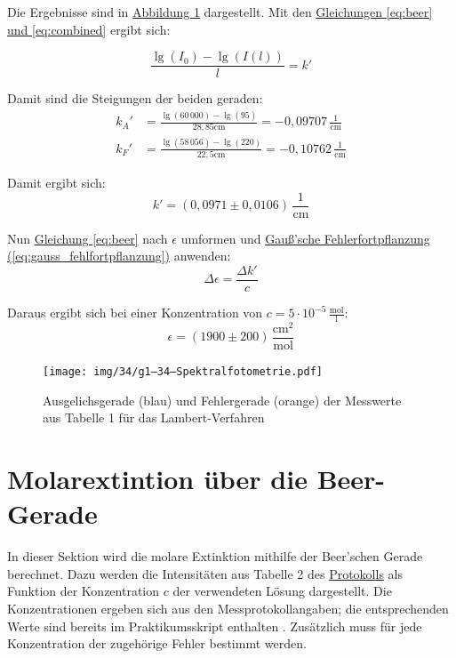 Die Ergebnisse sind in \hyperref[fig:g_l]{Abbildung \ref*{fig:g_l}} dargestellt. Mit den \hyperref[eq:beer]{Gleichungen \ref*{eq:beer} und \ref*{eq:combined}} ergibt sich:

\begin{equation}
\frac{\lg(I_0) - \lg(I(l))}{l} = k'
\end{equation}

Damit sind die Steigungen der beiden geraden:
\begin{align}
    {k_A}' &= \frac{\lg(60\,000) - \lg(95)}{28,85\mathrm{cm}} = -0,09707 \, \frac{1}{\mathrm{cm}}\\
    {k_F}' &= \frac{\lg(58\,056) - \lg(220)}{22,5\mathrm{cm}} = -0,10762 \, \frac{1}{\mathrm{cm}}
\end{align}

Damit ergibt sich:
\begin{equation}
\boxed{
    k' = (0,0971\pm 0,0106) \, \frac{1}{\mathrm{cm}}
}
\end{equation}

Nun \hyperref[eq:beer]{Gleichung \ref*{eq:beer}} nach $\epsilon$ umformen und \hyperref[eq:gauss_fehlfortpflanzung]{Gauß'sche Fehlerfortpflanzung (\ref*{eq:gauss_fehlfortpflanzung})} anwenden:
\begin{equation}
    \Delta \epsilon = \frac{\Delta k'}{c}
\end{equation}

Daraus ergibt sich bei einer Konzentration von $c = 5 \cdot 10^{-5} \, \mathrm{\frac{mol}{l}}$:
\begin{equation}
\boxed{
    \epsilon = (1900 \pm 200) \, \mathrm{\frac{cm^2}{mol}}
}
\end{equation}

\onecolumn
\begin{figure}
    \texttt{[image: img/34/g1--34–Spektralfotometrie.pdf]}
    \caption{Ausgelichsgerade (blau) und Fehlergerade (orange) der Messwerte aus Tabelle 1 für das Lambert-Verfahren}
    \label{fig:g_l}
\end{figure}
\twocolumn

\section{Molarextintion über die Beer-Gerade}
In dieser Sektion wird die molare Extinktion mithilfe der Beer’schen Gerade berechnet. Dazu werden die Intensitäten aus Tabelle 2 des \hyperref[Protokoll]{Protokolls} als Funktion der Konzentration \( c \) der verwendeten Lösung dargestellt. Die Konzentrationen ergeben sich aus den Messprotokollangaben; die entsprechenden Werte sind bereits im Praktikumsskript enthalten \cite{skript25}. Zusätzlich muss für jede Konzentration der zugehörige Fehler bestimmt werden.

